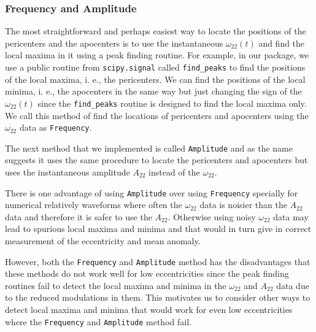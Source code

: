\documentclass[aps,prd,amsmath,floats,floatfix, twocolumn,
superscriptaddress,nofootinbib,showpacs]{revtex4-1}
\newcommand{\mAmp}{\texttt{Amplitude}}
\newcommand{\mFreq}{\texttt{Frequency}}
\begin{document}
\subsubsection{Frequency and Amplitude}
\label{sec:frequency-and-amplitude}
The most straightforward and perhaps easiest way to locate the positions of the
pericenters and the apocenters is to use the instantaneous
$\omega_{22}(t)$ and find the local maxima in it using a peak finding
routine. For example, in our package, we use a public routine from
\texttt{scipy.signal} called \texttt{find\_peaks} to find the positions
of the local maxima, i. e., the pericenters. We can find the positions
of the local minima, i. e., the apocenters in the same way but just
changing the sign of the $\omega_{22}(t)$ since the
\texttt{find\_peaks} routine is designed to find the local maxima
only. We call this method of find the locations of pericenters and
apocenters using the $\omega_{22}$ data as \mFreq{}.

The next method that we implemented is called \mAmp{} and
as the name suggests it uses the same procedure to locate the
pericenters and apocenters but uses the instantaneous amplitude
$A_{22}$ instead of the $\omega_{22}$.

There is one advantage of using \mAmp{} over using
\mFreq{} specially for numerical relatively waveforms where
often the $\omega_{22}$ data is noisier than the $A_{22}$ data and
therefore it is safer to use the $A_{22}$. Otherwise using noisy
$\omega_{22}$ data may lead to spurious local maxima and minima and
that would in turn give in correct measurement of the eccentricity and
mean anomaly.

However, both the \mFreq{} and \mAmp{} method has
the disadvantages that these methods do not work well for low
eccentricities since the peak finding routines fail to detect the
local maxima and minima in the $\omega_{22}$ and $A_{22}$ data due to
the reduced modulations in them. This motivates us to consider other
ways to detect local maxima and minima that would work for even low
eccentricities where the \mFreq{} and \mAmp{}
method fail.
\end{document}
